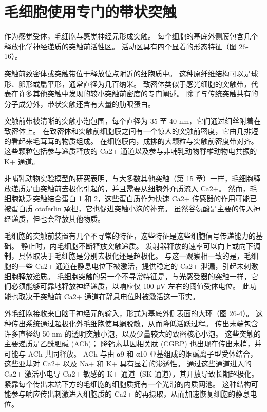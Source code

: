 \section{毛细胞使用专门的带状突触}

作为感觉受体，毛细胞与感觉神经元形成突触。 每个细胞的基底外侧膜包含几个释放化学神经递质的突触前活性区。 活动区具有四个显着的形态特征（图 26-16）。

突触前致密体或突触带位于释放位点附近的细胞质中。 这种原纤维结构可以是球形、卵形或扁平形，通常直径为几百纳米。 致密体类似于感光细胞的突触带，代表在许多其他突触中发现的较小突触前密度的专门阐述。 除了与传统突触共有的分子成分外，带状突触还含有大量的肋眼蛋白。

突触前带被清晰的突触小泡包围，每个直径为 35 至 40 nm，它们通过细丝附着在致密体上。 在致密体和突触前细胞膜之间有一个惊人的突触前密度，它由几排短的看起来毛茸茸的物质组成。 在细胞膜内，成排的大颗粒与突触前密度带对齐。 这些颗粒包括参与递质释放的 Ca2+ 通道以及参与非哺乳动物脊椎动物电共振的 K+ 通道。

非哺乳动物实验模型的研究表明，与大多数其他突触（第 15 章）一样，毛细胞释放递质是由突触前去极化引起的，并且需要从细胞外介质流入 Ca2+。 然而，毛细胞缺乏突触结合蛋白 1 和 2，这些蛋白质作为快速 Ca2+ 传感器的作用可能已被蛋白质 otoferlin 承担，它也促进突触小泡的补充。 虽然谷氨酸是主要的传入神经递质，但也会释放其他物质。

毛细胞的突触前装置有几个不寻常的特征，这些特征是这些细胞信号传递能力的基础。 静止时，内毛细胞不断释放突触递质。 发射器释放的速率可以向上或向下调制，具体取决于毛细胞是分别去极化还是超极化。 与这一观察相一致的是，毛细胞的一些 Ca2+ 通道在静息电位下被激活，提供稳定的 Ca2+ 泄漏，引起未刺激细胞释放递质。 毛细胞突触的另一个不寻常特征是，与光感受器的突触一样，它们必须能够可靠地释放神经递质，以响应仅 100 μV 左右的阈值受体电位。 此功能也取决于突触前 Ca2+ 通道在静息电位时被激活这一事实。

外毛细胞接收来自脑干神经元的输入，形式为基底外侧表面的大环（图 26-4）。 这种传出系统通过超极化外毛细胞使耳蜗脱敏，从而降低活跃过程。 传出末端包含许多直径约 50 nm 的透明突触小泡，以及少量较大的致密核心小泡。 这些突触的主要递质是乙酰胆碱 (ACh)； 降钙素基因相关肽 (CGRP) 也出现在传出末梢，并可能与 ACh 共同释放。 ACh 与由 α9 和 α10 亚基组成的烟碱离子型受体结合，这些亚基对 Ca2+ 以及 Na+ 和 K+ 具有显着的渗透性。 通过这些通道进入的 Ca2+ 激活小电导 Ca2+ 敏感的 K+ 通道（SK 通道），其开放导致长期超极化。 紧靠每个传出末端下方的毛细胞的细胞质拥有一个光滑的内质网池。 这种结构可能参与响应传出刺激进入细胞质的 Ca2+ 的再摄取，从而加速恢复细胞的静息电位。


